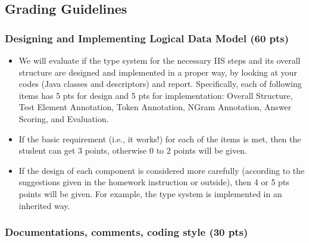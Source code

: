 
\subsection{Grading Guidelines}

\subsubsection{Designing and Implementing Logical Data Model (60 pts)}

\begin{itemize}

\item We will evaluate if the type system for the necessary IIS steps and its overall structure
are designed and implemented in a proper way, by looking at your
codes (Java classes and descriptors) and report. 
Specifically, each of following items has 5 pts for design and 5 pts for implementation: 
Overall Structure, Test Element Annotation, Token Annotation, NGram Annotation, Answer Scoring, and Evaluation.

\item If the basic requirement (i.e., it works!) for each of the items is met,
then the student can get 3 points, otherwise 0 to 2 points will be given.

\item If the design of each component is considered more carefully (according to
the suggestions given in the homework instruction or outside), then 4 or 5 pts
points will be given. For example, the type system is implemented in an inherited way.

\end{itemize}

\subsubsection{Documentations, comments, coding style (30 pts)}

